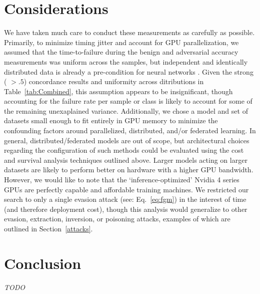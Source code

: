 \documentclass[conference]{IEEEtran}
\newcommand{\cm}[1]{\textit{{\color{blue}#1}}}
\begin{document}
\section{Considerations}
 We have taken much care to conduct these measurements as carefully as possible. Primarily, to minimize timing jitter and account for GPU parallelization, we assumed that the time-to-failure during the benign and adversarial accuracy measurements was uniform across the samples, but independent and identically distributed data is already a pre-condition for neural networks \cite{ma2022state}. Given the strong ( $>.5$) concordance results and uniformity across ditributions in Table~\ref{tab:Combined}, this assumption appears to be insignificant, though accounting for the failure rate per sample or class is likely to account for some of the remaining unexaplained variance. Additionally, we chose a model and set of datasets small enough to fit entirely in GPU memory to minimize the confounding factors around parallelized, distributed, and/or federated learning. In general, distributed/federated models are out of scope, but architectural choices regarding the configuration of such methods could be evaluated using the cost and survival analysis techniques outlined above. Larger models acting on larger datasets are likely to perform better on hardware with a higher GPU bandwidth. However, we would like to note that the `inference-optimized' Nvidia 4 series GPUs are perfectly capable and affordable training machines. We restricted our search to only a single evasion attack (see: Eq.~\ref{eq:fgm}) in the interest of time (and therefore deployment cost), though this analysis would generalize to other evasion, extraction, inversion, or poisoning attacks, examples of which are outlined in Section~\ref{attacks}. 
 
\section{Conclusion}
\cm{TODO}


\vspace{12pt}
\end{document}
